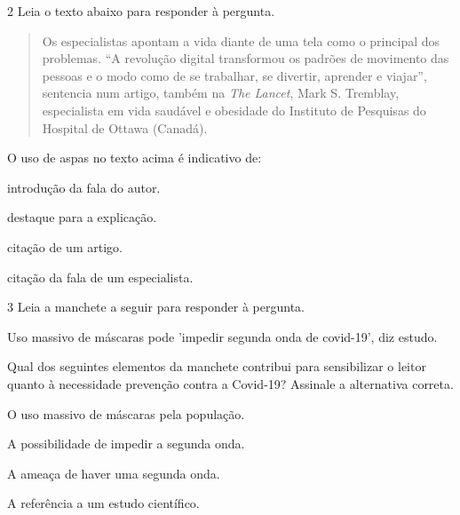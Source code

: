 \num{2} Leia o texto abaixo para responder à pergunta.

\begin{quote}

Os especialistas apontam a vida diante de uma tela como o principal dos
problemas. ``A revolução digital transformou os padrões de movimento das
pessoas e o modo como de se trabalhar, se divertir, aprender e viajar'',
sentencia num artigo, também na \textit{The Lancet}, Mark S. Tremblay,
especialista em vida saudável e obesidade do Instituto de Pesquisas do
Hospital de Ottawa (Canadá).

\end{quote}


O uso de aspas no texto acima é indicativo de:

\begin{escolha}

  \item introdução da fala do autor.

  \item destaque para a explicação.

  \item citação de um artigo.

  \item citação da fala de um especialista.

\end{escolha}


\num{3} Leia a manchete a seguir para responder à pergunta. 

Uso massivo de máscaras pode 'impedir segunda onda de covid-19', diz
estudo.


Qual dos seguintes elementos da manchete contribui para sensibilizar o leitor 
quanto à necessidade prevenção contra a Covid-19? Assinale a alternativa correta.

\begin{escolha}

  \item O uso massivo de máscaras pela população.

  \item A possibilidade de impedir a segunda onda.

  \item A ameaça de haver uma segunda onda.

  \item A referência a um estudo científico.

\end{escolha}


